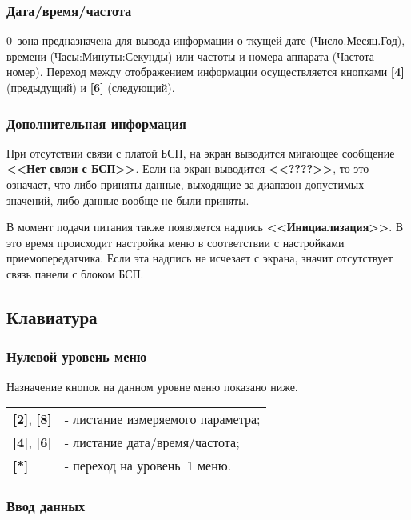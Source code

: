 \subsubsection{Дата/время/частота}

0~зона предназначена для вывода информации о ткущей дате (Число.Месяц.Год), времени (Часы:Минуты:Секунды) или частоты и номера аппарата (Частота-номер). Переход между отображением информации осуществляется кнопками \textbf{[4]} (предыдущий) и \textbf{[6]} (следующий).


\subsubsection{Дополнительная информация}

При отсутствии связи с платой БСП, на экран выводится мигающее сообщение \textbf{<<Нет связи с БСП>>}. Если на экран выводится \textbf{<<????>>}, то это означает, что либо приняты данные, выходящие за диапазон допустимых значений, либо данные вообще не были приняты.

В момент подачи питания также появляется надпись \textbf{<<Инициализация>>}. В это время происходит настройка меню в соответствии с настройками приемопередатчика. Если эта надпись не исчезает с экрана, значит отсутствует связь панели с блоком БСП.
 
 
\subsection{Клавиатура} \label{ssec:keyboard}


\subsubsection{Нулевой уровень меню}

Назначение кнопок на данном уровне меню показано ниже.

\begin{center}
	\begin{tabular}{p{2cm} p{15cm}}
	    \textbf{[2]}, \textbf{[8]} & - листание измеряемого параметра; \tabularnewline
	    \textbf{[4]}, \textbf{[6]} & - листание дата/время/частота; \tabularnewline
	    \textbf{[*]} & - переход на уровень~1 меню. 				
	\end{tabular} 
\end{center}


\subsubsection{Ввод данных} \label{sssec:keyboard_enter}

